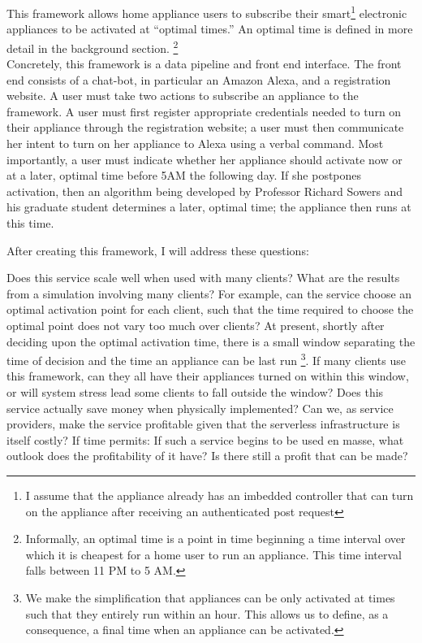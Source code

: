 \documentclass[a4paper]{article}
\begin{document}
This framework allows home appliance users to subscribe their smart\footnote{I assume that the appliance already has an imbedded controller that can turn on the appliance after receiving an authenticated post request} electronic
appliances  to be activated at ``optimal times.'' An optimal time is defined in more detail in the background section. \footnote{Informally, an optimal time is a point in time beginning a time interval over which it is cheapest for a home user to run an appliance. This time interval falls between 11 PM to 5 AM.} \\

Concretely, this framework is a data pipeline and front end interface. The front end consists of a chat-bot, in particular an Amazon Alexa, and a registration website. A user must take two actions to subscribe an appliance to the framework. A user must first register appropriate credentials needed to turn on their appliance through the registration website; a user must then communicate her intent to turn on her appliance to Alexa using a verbal command. Most importantly, a user must indicate whether her appliance should activate now or at a later, optimal time before 5AM the following day. If she postpones activation, then an algorithm being developed by Professor Richard Sowers and his graduate student determines a later, optimal time; the appliance then runs at this time.

After creating this framework, I will address these questions:

\begin{outline}
    \1 Does this service scale well when used with many clients? What are the
    results from a simulation involving many clients?
    \2 For example, can the service choose an optimal activation point for each client, such
    that the time required to choose the optimal point does not vary too much over clients?
    \2 At present, shortly after deciding upon the optimal activation time, there is a small
    window separating the time of decision and the time an appliance can be last run \footnote{We make the simplification that appliances can be only activated at times such that they entirely run within an hour. This allows us to define, as a consequence, a final time when an appliance can be activated.}. If many clients use this framework, can they all have their appliances turned on within this window, or will system stress lead some clients to fall outside the window?
    \1 Does this service actually save money when physically implemented? Can we, as service providers, make the service profitable given that the serverless infrastructure is itself costly?
    \1 If time permits: If such a service begins to be used en masse, what
    outlook does the profitability of it have? Is there still a profit that can be made?
\end{outline}
\end{document}
